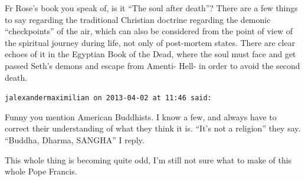 \begin{footnotesize}
\begin{sffamily}
Fr Rose's book you speak of, is it ``The soul after death''? There are a few things to say regarding the traditional Christian doctrine regarding the demonic ``checkpoints'' of the air, which can also be considered from the point of view of the spiritual journey during life, not only of post-mortem states. There are clear echoes of it in the Egyptian Book of the Dead, where the soul must face and get passed Seth's demons and escape from Amenti- Hell- in order to avoid the second death.

\hfill

\texttt{jalexandermaximilian on 2013-04-02 at 11:46 said:}

Funny you mention American Buddhists. I know a few, and always have to correct their understanding of what they think it is. ``It's not a religion'' they say. ``Buddha, Dharma, SANGHA'' I reply.

This whole thing is becoming quite odd, I'm still not sure what to make of this whole Pope Francis.

\end{sffamily}
\end{footnotesize}

